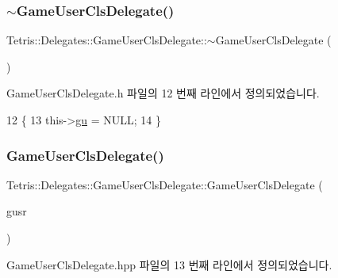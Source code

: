 \subsubsection{\texorpdfstring{$\sim$\+Game\+User\+Cls\+Delegate()}{~GameUserClsDelegate()}\hspace{0.1cm}{\footnotesize\ttfamily [1/2]}}
{\footnotesize\ttfamily Tetris\+::\+Delegates\+::\+Game\+User\+Cls\+Delegate\+::$\sim$\+Game\+User\+Cls\+Delegate (\begin{DoxyParamCaption}{ }\end{DoxyParamCaption})\hspace{0.3cm}{\ttfamily [inline]}}



Game\+User\+Cls\+Delegate.\+h 파일의 12 번째 라인에서 정의되었습니다.


\begin{DoxyCode}
12                                           \{
13                         this->\hyperlink{class_tetris_1_1_delegates_1_1_game_user_cls_delegate_affeaedfa26fa58ee383fff43692f6709}{gu} = NULL;
14                     \}
\end{DoxyCode}
\mbox{\label{class_tetris_1_1_delegates_1_1_game_user_cls_delegate_a0b4ced1872f2e51b74a3960f3a290899}} 
\subsubsection{\texorpdfstring{Game\+User\+Cls\+Delegate()}{GameUserClsDelegate()}\hspace{0.1cm}{\footnotesize\ttfamily [2/2]}}
{\footnotesize\ttfamily Tetris\+::\+Delegates\+::\+Game\+User\+Cls\+Delegate\+::\+Game\+User\+Cls\+Delegate (\begin{DoxyParamCaption}\item[{\hyperlink{class_tetris_1_1_users_1_1_game_user}{Game\+User} $\ast$}]{gusr }\end{DoxyParamCaption})\hspace{0.3cm}{\ttfamily [inline]}}



Game\+User\+Cls\+Delegate.\+hpp 파일의 13 번째 라인에서 정의되었습니다.


